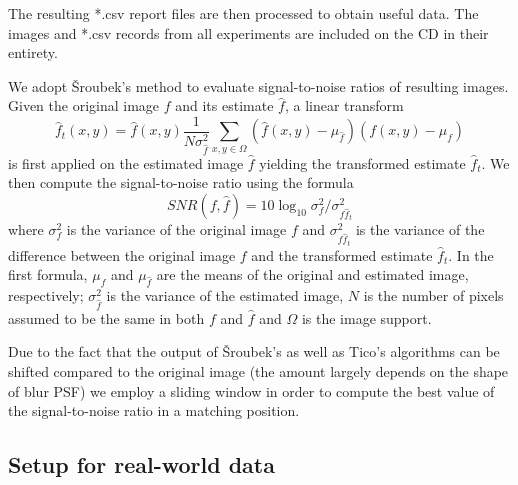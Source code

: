 \documentclass[12pt,notitlepage]{report}
\begin{document}
The resulting *.csv report files are then processed to obtain useful data. The images and *.csv records from all experiments are included on the CD in their entirety.

We adopt Šroubek's method to evaluate signal-to-noise ratios of resulting images. Given the original image $f$ and its estimate $\hat{f}$, a linear transform 
\begin{equation}
\label{eq:sroubek_snr_01}
	\hat{f}_t(x,y) = \hat{f}(x,y)  \frac{1}{{N\sigma^2_{\hat{f}}}} \sum_{x,y \in \Omega}^{}(\hat{f}(x,y) - \mu_{\hat{f}})(f(x,y) - \mu_{f})  
\end{equation}
is first applied on the estimated image $\hat{f}$ yielding the transformed estimate $\hat{f}_t$. We then compute the signal-to-noise ratio using the formula
\begin{equation}
\label{eq:sroubek_snr_02}
	SNR(f,\hat{f}) = 10 \log_{10} \sigma^2_f / \sigma^2_{f\hat{f}_t}
\end{equation}
where $\sigma^2_f$ is the variance of the original image $f$ and $\sigma^2_{f\hat{f}_t}$ is the variance of the difference between the original image $f$ and the transformed estimate $\hat{f}_t$. In the first formula, $\mu_{f}$ and $\mu_{\hat{f}}$ are the means of the original and estimated image, respectively; $\sigma^2_{\hat{f}}$ is the variance of the estimated image, $N$ is the number of pixels assumed to be the same in both $f$ and $\hat{f}$ and $\Omega$ is the image support.   
 
Due to the fact that the output of Šroubek's as well as Tico's algorithms can be shifted compared to the original image (the amount largely depends on the shape of blur PSF) we employ a sliding window in order to compute the best value of the signal-to-noise ratio in a matching position. 

\subsection{Setup for real-world data}
\label{sec:setup_for_real_world_data}
\end{document}
